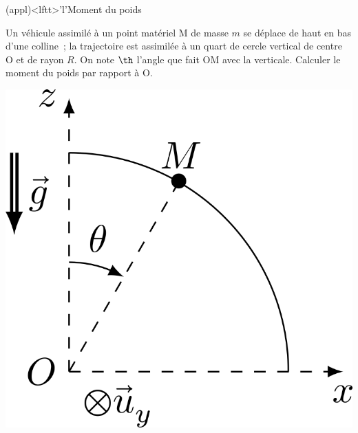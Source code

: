 \documentclass[../../main/main.tex]{subfiles}
\begin{document}
\begin{tcb*}(appl)<lftt>'l'{Moment du poids}
	\begin{minipage}[c]{0.70\linewidth}
		Un véhicule assimilé à un point matériel M de masse $m$ se déplace de
		haut en bas d'une colline~; la trajectoire est assimilée à un quart de
		cercle vertical de centre O et de rayon $R$. On note $\th$ l'angle que
		fait OM avec la verticale. Calculer le moment du poids par rapport à O.
	\end{minipage}
	\hfill
	\begin{minipage}{0.25\linewidth}
		\begin{center}
			\includegraphics[scale=1]{moment_force-ex}
		\end{center}
	\end{minipage}
	\tcblower
\end{tcb*}
\end{document}
